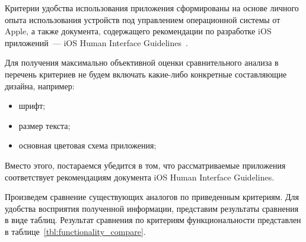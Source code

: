 Критерии удобства использования приложения сформированы на основе личного опыта
использования устройств под управлением операционной системы от Apple, а также
документа, содержащего рекомендации по разработке iOS приложений~---
iOS Human Interface Guidelines~\cite{ios_hig}.

Для получения максимально объективной оценки сравнительного анализа в перечень
критериев не будем включать какие-либо конкретные составляющие дизайна, например:
\begin{itemize}
  \item шрифт;
  \item размер текста;
  \item основная цветовая схема приложения;
\end{itemize}

Вместо этого, постараемся убедится в том, что рассматриваемые приложения
соответствует рекомендациям документа iOS Human Interface Guidelines.

\newpage

Произведем сравнение существующих аналогов по приведенным критериям. Для удобства
восприятия полученной информации, представим результаты сравнения в виде таблиц.
Результат сравнения по критериям функциональности представлен
в таблице~\ref{tbl:functionality_compare}.

